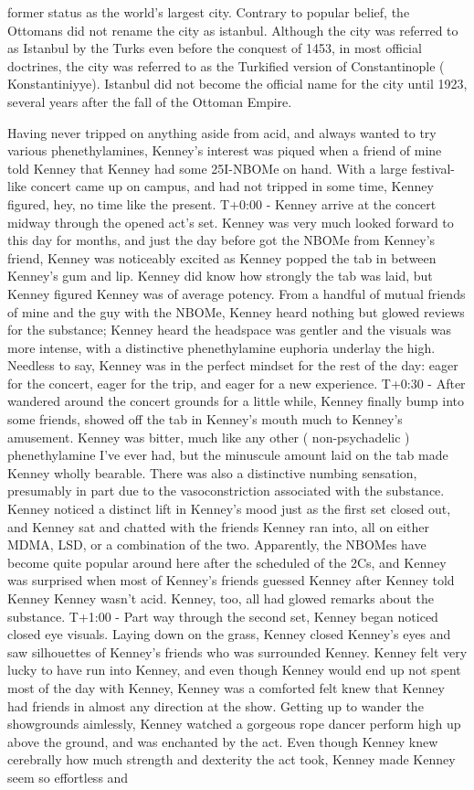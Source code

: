 \documentclass[12pt]{book}
\begin{document}
former status as the world's largest city. Contrary to popular belief, the Ottomans did not rename the city as istanbul. Although the city was referred to as Istanbul by the Turks even before the conquest of 1453, in most official doctrines, the city was referred to as the Turkified version of Constantinople ( Konstantiniyye). Istanbul did not become the official name for the city until 1923, several years after the fall of the Ottoman Empire.



Having never tripped on anything aside from acid, and always wanted to try various phenethylamines, Kenney's interest was piqued when a friend of mine told Kenney that Kenney had some 25I-NBOMe on hand. With a large festival-like concert came up on campus, and had not tripped in some time, Kenney figured, hey, no time like the present. T+0:00 - Kenney arrive at the concert midway through the opened act's set. Kenney was very much looked forward to this day for months, and just the day before got the NBOMe from Kenney's friend, Kenney was noticeably excited as Kenney popped the tab in between Kenney's gum and lip. Kenney did know how strongly the tab was laid, but Kenney figured Kenney was of average potency. From a handful of mutual friends of mine and the guy with the NBOMe, Kenney heard nothing but glowed reviews for the substance; Kenney heard the headspace was gentler and the visuals was more intense, with a distinctive phenethylamine euphoria underlay the high. Needless to say, Kenney was in the perfect mindset for the rest of the day: eager for the concert, eager for the trip, and eager for a new experience. T+0:30 - After wandered around the concert grounds for a little while, Kenney finally bump into some friends, showed off the tab in Kenney's mouth much to Kenney's amusement. Kenney was bitter, much like any other ( non-psychadelic ) phenethylamine I've ever had, but the minuscule amount laid on the tab made Kenney wholly bearable. There was also a distinctive numbing sensation, presumably in part due to the vasoconstriction associated with the substance. Kenney noticed a distinct lift in Kenney's mood just as the first set closed out, and Kenney sat and chatted with the friends Kenney ran into, all on either MDMA, LSD, or a combination of the two. Apparently, the NBOMes have become quite popular around here after the scheduled of the 2Cs, and Kenney was surprised when most of Kenney's friends guessed Kenney after Kenney told Kenney Kenney wasn't acid. Kenney, too, all had glowed remarks about the substance. T+1:00 - Part way through the second set, Kenney began noticed closed eye visuals. Laying down on the grass, Kenney closed Kenney's eyes and saw silhouettes of Kenney's friends who was surrounded Kenney. Kenney felt very lucky to have run into Kenney, and even though Kenney would end up not spent most of the day with Kenney, Kenney was a comforted felt knew that Kenney had friends in almost any direction at the show. Getting up to wander the showgrounds aimlessly, Kenney watched a gorgeous rope dancer perform high up above the ground, and was enchanted by the act. Even though Kenney knew cerebrally how much strength and dexterity the act took, Kenney made Kenney seem so effortless and 
\end{document}
